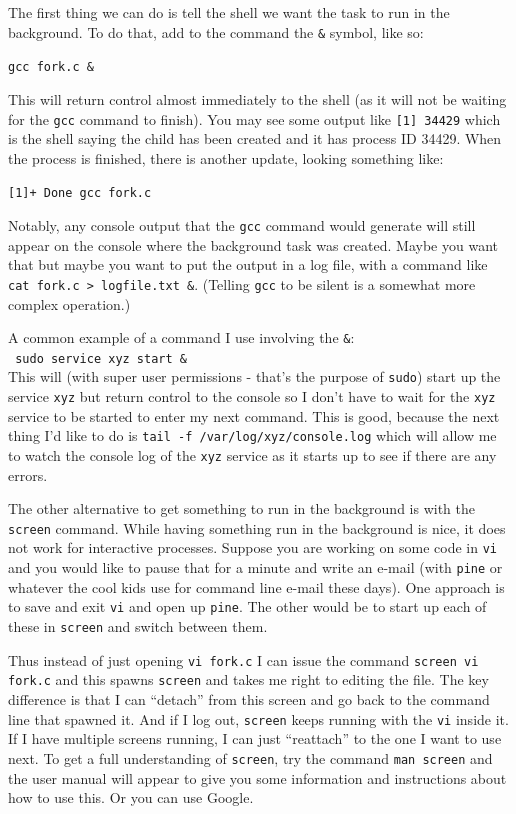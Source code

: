 The first thing we can do is tell the shell we want the task to run in the background. To do that, add to the command the \texttt{\&} symbol, like so:

\texttt{gcc fork.c \&}

This will return control almost immediately to the shell (as it will not be waiting for the \texttt{gcc} command to finish). You may see some output like \texttt{[1] 34429} which is the shell saying the child has been created and it has process ID 34429. When the process is finished, there is another update, looking something like:

\texttt{[1]+  Done                    gcc fork.c}

Notably, any console output that the \texttt{gcc} command would generate will still appear on the console where the background task was created. Maybe you want that but maybe you want to put the output in a log file, with a command like \texttt{cat fork.c > logfile.txt \&}. (Telling \texttt{gcc} to be silent is a somewhat more complex operation.)

A common example of a command I use involving the \texttt{\&}:\\
\texttt{ sudo service xyz start \& }\\
This will (with super user permissions - that's the purpose of \texttt{sudo}) start up the service \texttt{xyz} but return control to the console so I don't have to wait for the \texttt{xyz} service to be started to enter my next command. This is good, because the next thing I'd like to do is \texttt{tail -f /var/log/xyz/console.log} which will allow me to watch the console log of the \texttt{xyz} service as it starts up to see if there are any errors.

The other alternative to get something to run in the background is with the \texttt{screen} command. While having something run in the background is nice, it does not work for interactive processes. Suppose you are working on some code in \texttt{vi} and you would like to pause that for a minute and write an e-mail (with \texttt{pine} or whatever the cool kids use for command line e-mail these days). One approach is to save and exit \texttt{vi} and open up \texttt{pine}. The other would be to start up each of these in \texttt{screen} and switch between them.

Thus instead of just opening \texttt{vi fork.c} I can issue the command \texttt{screen vi fork.c} and this spawns \texttt{screen} and takes me right to editing the file. The key difference is that I can ``detach'' from this screen and go back to the command line that spawned it. And if I log out, \texttt{screen} keeps running with the \texttt{vi} inside it. If I have multiple screens running, I can just ``reattach'' to the one I want to use next. To get a full understanding of \texttt{screen}, try the command \texttt{man screen} and the user manual will appear to give you some information and instructions about how to use this. Or you can use Google.


